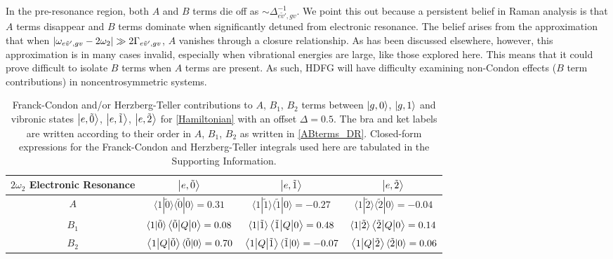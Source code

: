 \documentclass[aip, jcp, reprint, onecolumn, nofootinbib]{revtex4-2}
\begin{document}
In the pre-resonance region, both $A$ and $B$ terms die off as $\sim \Delta_{e\tilde{v}',gv}^{-1}$.
We point this out because a persistent belief in Raman analysis is that $A$ terms disappear and $B$ terms dominate when significantly detuned from electronic resonance.
The belief arises from the approximation that when $\abs{\omega_{e\tilde{v}',gv} - 2\omega_2} \gg 2\Gamma_{e\tilde{v}',gv}$, $A$ vanishes through a closure relationship.\cite{Neddersen1989}
As has been discussed elsewhere, however, this approximation is in many cases invalid, especially when vibrational energies are large, like those explored here.\cite{Warshel1977, Myers1982, Li1990, Gong2015}
This means that it could prove difficult to isolate $B$ terms when $A$ terms are present.
As such, HDFG will have difficulty examining non-Condon effects ($B$ term contributions) in noncentrosymmetric systems.

\begin{table}[!htbp]
	\caption{\label{T:contributions} Franck-Condon and/or Herzberg-Teller contributions to $A$, $B_1$, $B_2$ terms between $\ket{g,0}$, $\ket{g,1}$ and vibronic states $\ket{e,\tilde{0}}$, $\ket{e,\tilde{1}}$, $\ket{e,\tilde{2}}$ for \autoref{Hamiltonian} with an offset $\Delta = 0.5$.
	The bra and ket labels are written according to their order in $A$, $B_1$, $B_2$ as written in \autoref{ABterms_DR}.
	Closed-form expressions for the Franck-Condon and Herzberg-Teller integrals used here are tabulated in the Supporting Information.}
	\begin{ruledtabular}
		\begin{tabular}{cccc}\label{fcht}
			$2\omega_2$ Electronic Resonance & $\ket{e,\tilde{0}}$ & $\ket{e,\tilde{1}}$ & $\ket{e,\tilde{2}}$\\
			\hline  
			$A$ 
			& $\langle 1 | \tilde{0} \rangle \langle \tilde{0} | 0 \rangle = 0.31 $  
			& $\langle 1 | \tilde{1} \rangle \langle \tilde{1} | 0 \rangle = -0.27 $ 
			& $\langle 1 | \tilde{2} \rangle \langle \tilde{2} | 0 \rangle = -0.04$\\
					
			$B_1$ 
			& $\langle 1 | \tilde{0} \rangle \mel{\tilde{0}}{Q}{0} = 0.08$ 
			& $\langle 1 | \tilde{1} \rangle \mel{\tilde{1}}{Q}{0} = 0.48$ 
			&$\langle 1 | \tilde{2} \rangle \mel{\tilde{2}}{Q}{0} = 0.14$\\
						
			$B_2$ 
			& $\mel{1}{Q}{\tilde{0}} \langle \tilde{0} | 0 \rangle = 0.70$  
			& $\mel{1}{Q}{\tilde{1}} \langle \tilde{1} | 0 \rangle = -0.07$ 
			& $\mel{1}{Q}{\tilde{2}} \langle \tilde{2} | 0 \rangle = 0.06$\\
		\end{tabular}
	\end{ruledtabular}
\end{table}
\end{document}
